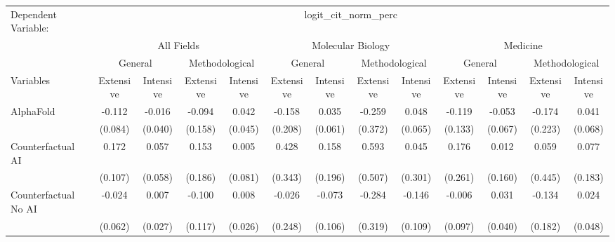 \begingroup
\centering
\begin{tabular}{lcccccccccccc}
   \tabularnewline \midrule \midrule
   Dependent Variable: & \multicolumn{12}{c}{logit\_cit\_norm\_perc}\\
 & \multicolumn{4}{c}{All Fields} & \multicolumn{4}{c}{Molecular Biology} & \multicolumn{4}{c}{Medicine} \\
\cmidrule(lr){2-5} \cmidrule(lr){6-9} \cmidrule(lr){10-13}
 & \multicolumn{2}{c}{General} & \multicolumn{2}{c}{Methodological} & \multicolumn{2}{c}{General} & \multicolumn{2}{c}{Methodological} & \multicolumn{2}{c}{General} & \multicolumn{2}{c}{Methodological} \\
\cmidrule(lr){2-3} \cmidrule(lr){4-5} \cmidrule(lr){6-7} \cmidrule(lr){8-9} \cmidrule(lr){10-11} \cmidrule(lr){12-13}
Variables & \multicolumn{1}{c}{Extensive} & \multicolumn{1}{c}{Intensive} & \multicolumn{1}{c}{Extensive} & \multicolumn{1}{c}{Intensive} & \multicolumn{1}{c}{Extensive} & \multicolumn{1}{c}{Intensive} & \multicolumn{1}{c}{Extensive} & \multicolumn{1}{c}{Intensive} & \multicolumn{1}{c}{Extensive} & \multicolumn{1}{c}{Intensive} & \multicolumn{1}{c}{Extensive} & \multicolumn{1}{c}{Intensive} \\
\cmidrule(lr){1-1}\cmidrule(lr){2-2} \cmidrule(lr){3-3} \cmidrule(lr){4-4} \cmidrule(lr){5-5} \cmidrule(lr){6-6} \cmidrule(lr){7-7} \cmidrule(lr){8-8} \cmidrule(lr){9-9} \cmidrule(lr){10-10} \cmidrule(lr){11-11} \cmidrule(lr){12-12} \cmidrule(lr){13-13}
   AlphaFold                                & -0.112  & -0.016  & -0.094  & 0.042   & -0.158  & 0.035   & -0.259  & 0.048   & -0.119  & -0.053  & -0.174  & 0.041\\   
                                            & (0.084) & (0.040) & (0.158) & (0.045) & (0.208) & (0.061) & (0.372) & (0.065) & (0.133) & (0.067) & (0.223) & (0.068)\\   
   Counterfactual AI                        & 0.172   & 0.057   & 0.153   & 0.005   & 0.428   & 0.158   & 0.593   & 0.045   & 0.176   & 0.012   & 0.059   & 0.077\\   
                                            & (0.107) & (0.058) & (0.186) & (0.081) & (0.343) & (0.196) & (0.507) & (0.301) & (0.261) & (0.160) & (0.445) & (0.183)\\   
   Counterfactual No AI                     & -0.024  & 0.007   & -0.100  & 0.008   & -0.026  & -0.073  & -0.284  & -0.146  & -0.006  & 0.031   & -0.134  & 0.024\\   
                                            & (0.062) & (0.027) & (0.117) & (0.026) & (0.248) & (0.106) & (0.319) & (0.109) & (0.097) & (0.040) & (0.182) & (0.048)\\   

\end{tabular}
